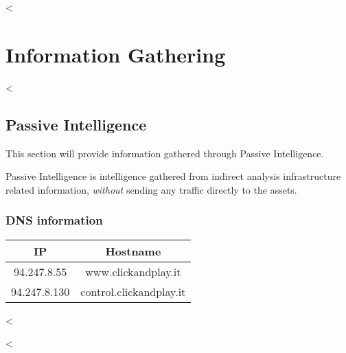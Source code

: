 

<%


\chapter{Information Gathering}\label{ch:infogath}

  <%

  \section {Passive Intelligence}\label{sec:passiveint}

    This section will provide information gathered through Passive Intelligence.

    Passive Intelligence is intelligence gathered from indirect analysis
    infrastructure related information, \textit{without} sending any traffic
    directly to the assets.

    \subsection{DNS information}\label{sub:dnsinfo}

      \begin{itemize}
        <%
          \item \textbf{<%
            \begin{verbatim}
<%= dns_scan[:result] %>
            \end{verbatim}
        <%
      \end{itemize}

      \begin{center}
        \begin{tabularx}{0.4\textwidth}{c c}
          \toprule
          \textbf{IP} & \textbf{Hostname} \\ \midrule
          94.247.8.55 &  www.clickandplay.it \\ \midrule
          94.247.8.130 & control.clickandplay.it  \\
          \bottomrule
        \end{tabularx}
      \end{center}
  <%

  <%


